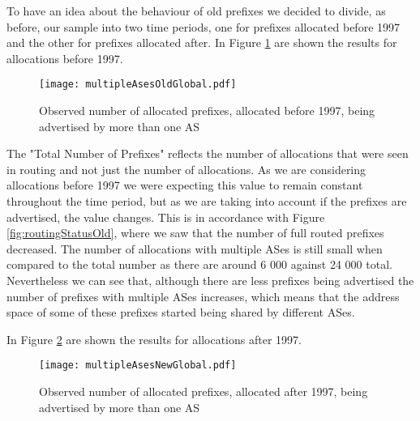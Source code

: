 \documentclass[11pt,a4paper]{scrreprt}
\begin{document}
To have an idea about the behaviour of old prefixes we decided to divide, as before, our sample into two time periods, one for prefixes allocated before 1997 and the other for prefixes allocated after. In Figure \ref{fig:multipleAsesOldGlobal} are shown the results for allocations before 1997.

\begin{figure}[!h]
\centering
\texttt{[image: multipleAsesOldGlobal.pdf]}
\caption{Observed number of allocated prefixes, allocated before 1997, being advertised by more than one AS}
\label{fig:multipleAsesOldGlobal}
\end{figure}

The "Total Number of Prefixes" reflects the number of allocations that were seen in routing and not just the number of allocations. As we are considering allocations before 1997 we were expecting this value to remain constant throughout the time period, but as we are taking into account if the prefixes are advertised, the value changes. This is in accordance with Figure \ref{fig:routingStatusOld}, where we saw that the number of full routed prefixes decreased. 
The number of allocations with multiple ASes is still small when compared to the total number as there are around 6 000 against 24 000 total. Nevertheless we can see that, although there are less prefixes being advertised the number of prefixes with multiple ASes increases, which means that the address space of some of these prefixes started being shared by different ASes. 

In Figure \ref{fig:multipleAsesNewGlobal} are shown the results for allocations after 1997.

\begin{figure}[!h]
\centering
\texttt{[image: multipleAsesNewGlobal.pdf]}
\caption{Observed number of allocated prefixes, allocated after 1997, being advertised by more than one AS}
\label{fig:multipleAsesNewGlobal}
\end{figure}
\end{document}
